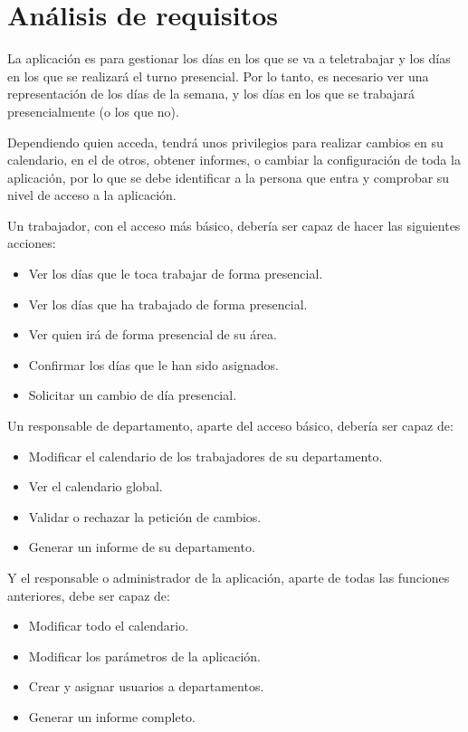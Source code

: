 \documentclass[11pt,spanish,listoffigures,listoftables]{tfgetsinf}
\begin{document}
\chapter{Análisis de requisitos}

La aplicación es para gestionar los días en los que se va a teletrabajar y los días en los que se realizará el turno presencial. 
Por lo tanto, es necesario ver una representación de los días de la semana, y los días en los que se trabajará presencialmente (o los que no).

Dependiendo quien acceda, tendrá unos privilegios para realizar cambios en su calendario, en el de otros, obtener informes, o cambiar la configuración de toda la aplicación, por lo que se debe identificar a la persona que entra y comprobar su nivel de acceso a la aplicación.

Un trabajador, con el acceso más básico, debería ser capaz de hacer las siguientes acciones:

\begin{itemize}
   \item Ver los días que le toca trabajar de forma presencial.
   \item Ver los días que ha trabajado de forma presencial.
   \item Ver quien irá de forma presencial de su área.
   \item Confirmar los días que le han sido asignados.
   \item Solicitar un cambio de día presencial.
\end{itemize}

Un responsable de departamento, aparte del acceso básico, debería ser capaz de:

\begin{itemize}
   \item Modificar el calendario de los trabajadores de su departamento.
   \item Ver el calendario global.
   \item Validar o rechazar la petición de cambios.
   \item Generar un informe de su departamento.
\end{itemize}

Y el responsable o administrador de la aplicación, aparte de todas las funciones anteriores, debe ser capaz de:

\begin{itemize}
   \item Modificar todo el calendario.
   \item Modificar los parámetros de la aplicación.
   \item Crear y asignar usuarios a departamentos.
   \item Generar un informe completo.
\end{itemize}
\end{document}
